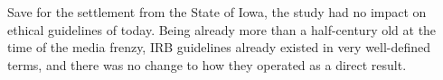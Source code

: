 \documentclass{../../../coursework}
\begin{document}
Save for the settlement from the State of Iowa, the study had no impact
on ethical guidelines of today. Being already more than a half-century
old at the time of the media frenzy, IRB guidelines already existed in
very well-defined terms, and there was no change to how they operated as
a direct result.

\printbibliography
\end{document}
